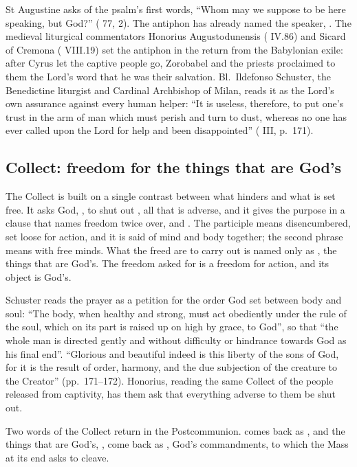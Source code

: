 St Augustine asks of the psalm's first words, ``Whom may we suppose to be here
speaking, but God?'' ( 77, 2). The antiphon has
already named the speaker, . The medieval liturgical
commentators Honorius Augustodunensis ( IV.86) and Sicard of
Cremona ( VIII.19) set the antiphon in the return from the
Babylonian exile: after Cyrus let the captive people go, Zorobabel and the
priests proclaimed to them the Lord's word that he was their salvation.
Bl.\ Ildefonso Schuster, the Benedictine liturgist and Cardinal Archbishop of
Milan, reads it as the Lord's own assurance against every human helper: ``It
is useless, therefore, to put one's trust in the arm of man which must perish
and turn to dust, whereas no one has ever called upon the Lord for help and
been disappointed'' ( III, p.~171).

\subsection{Collect: freedom for the things that are God's}

The Collect is built on a single contrast between what hinders and what is set
free. It asks God, , to shut out , all that is adverse, and it gives the purpose in a clause that
names freedom twice over,  and
. The participle  means disencumbered,
set loose for action, and it is said of mind and body together; the second
phrase means with free minds. What the freed are to carry out is named only as
, the things that are God's. The freedom asked for is a
freedom for action, and its object is God's.

Schuster reads the prayer as a petition for the order God set between body and
soul: ``The body, when healthy and strong, must act obediently under the rule
of the soul, which on its part is raised up on high by grace, to God'', so
that ``the whole man is directed gently and without difficulty or hindrance
towards God as his final end''. ``Glorious and beautiful indeed is this liberty
of the sons of God, for it is the result of order, harmony, and the due
subjection of the creature to the Creator'' (pp.~171--172). Honorius, reading
the same Collect of the people released from captivity, has them ask that
everything adverse to them be shut out.

Two words of the Collect return in the Postcommunion.  comes
back as , and the things that are God's, ,
come back as , God's commandments, to which the Mass
at its end asks to cleave.

